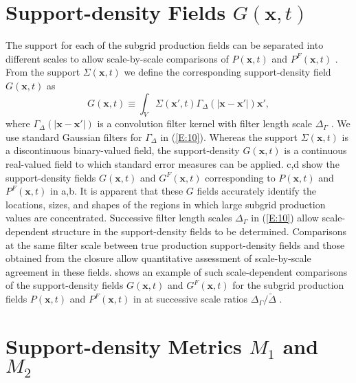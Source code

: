 \section{Support-density Fields $G(\mathbf{x},t)$ }
\label{sec:IIID}

The support for each of the subgrid production fields can be separated into different scales to allow scale-by-scale comparisons of  $P(\mathbf{x},t)$ and $P^F(\mathbf{x},t)$   . From the support  $\Sigma(\mathbf{x},t)$  we define the corresponding support-density field  $G(\mathbf{x},t)$  as 
%
\begin{equation}
	\label{E:10}
	G(\mathbf{x},t) 
	\equiv 
	\int_{V} \Sigma(\mathbf{x'},t)\Gamma_{\Delta}(|\mathbf{x} - \mathbf{x'}|) \mathbf{x'}, 
\end{equation}
%
%                
where $\Gamma_{\Delta}(|\mathbf{x} - \mathbf{x'}|)$  is a convolution filter kernel with filter length scale $\Delta_{\Gamma}$ . We use standard Gaussian filters for $\Gamma_{\Delta}$  in (\ref{E:10}). Whereas the support $\Sigma(\mathbf{x},t)$  is a discontinuous binary-valued field, the support-density $G(\mathbf{x},t)$  is a continuous real-valued field to which standard error measures can be applied. c,d show the support-density fields $G(\mathbf{x},t)$  and  $G^{F}(\mathbf{x},t)$ corresponding to   $P(\mathbf{x},t)$  and  $P^{F}(\mathbf{x},t)$   in a,b. It is apparent that these $G$ fields accurately identify the locations, sizes, and shapes of the regions in which large subgrid production values are concentrated. 
Successive filter length scales  $\Delta_{\Gamma}$ in (\ref{E:10}) allow scale-dependent structure in the support-density fields to be determined. Comparisons at the same filter scale between true production support-density fields and those obtained from the closure allow quantitative assessment of scale-by-scale agreement in these fields.  shows an example of such scale-dependent comparisons of the support-density fields   $G(\mathbf{x},t)$  and  $G^{F}(\mathbf{x},t)$   for the subgrid production fields   $P(\mathbf{x},t)$  and  $P^{F}(\mathbf{x},t)$   in  at successive scale ratios $\Delta_{\Gamma}/\widetilde{\Delta}$ . 

\section{Support-density Metrics  $M_1$ and $M_2$ }
\label{sec:IIIE}

